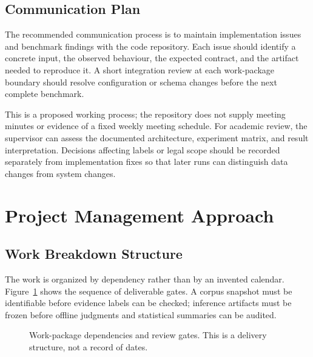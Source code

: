 \subsection{Communication Plan}
The recommended communication process is to maintain implementation issues and benchmark findings with the code repository. Each issue should identify a concrete input, the observed behaviour, the expected contract, and the artifact needed to reproduce it. A short integration review at each work-package boundary should resolve configuration or schema changes before the next complete benchmark.

This is a proposed working process; the repository does not supply meeting minutes or evidence of a fixed weekly meeting schedule. For academic review, the supervisor can assess the documented architecture, experiment matrix, and result interpretation. Decisions affecting labels or legal scope should be recorded separately from implementation fixes so that later runs can distinguish data changes from system changes.

\section{Project Management Approach}
\subsection{Work Breakdown Structure}
The work is organized by dependency rather than by an invented calendar. Figure~\ref{fig:wbs} shows the sequence of deliverable gates. A corpus snapshot must be identifiable before evidence labels can be checked; inference artifacts must be frozen before offline judgments and statistical summaries can be audited.

\begin{figure}[H]\centering
{}
\caption{Work-package dependencies and review gates. This is a delivery structure, not a record of dates.}\label{fig:wbs}
\end{figure}

